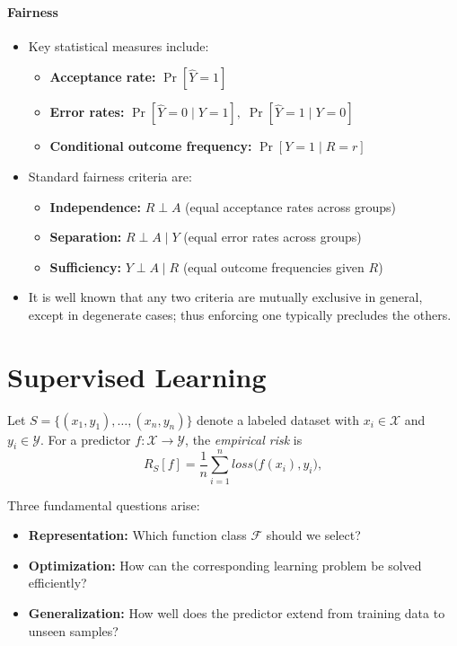 \documentclass[a4paper]{article}
\begin{document}
\paragraph{Fairness}
\begin{itemize}
    \item Key statistical measures include:
        \begin{itemize}
            \item \textbf{Acceptance rate:} $\Pr[\hat{Y} = 1]$
            \item \textbf{Error rates:} $\Pr[\hat{Y} = 0 \mid Y = 1],\; \Pr[\hat{Y} = 1 \mid Y = 0]$
            \item \textbf{Conditional outcome frequency:} $\Pr[Y = 1 \mid R = r]$
        \end{itemize}

    \item Standard fairness criteria are:
        \begin{itemize}
            \item \textbf{Independence:} $R \perp A$ \quad (equal acceptance rates across groups)
            \item \textbf{Separation:} $R \perp A \mid Y$ \quad (equal error rates across groups)
            \item \textbf{Sufficiency:} $Y \perp A \mid R$ \quad (equal outcome frequencies given $R$)
        \end{itemize}
    \item It is well known that any two criteria are mutually exclusive in general, except in degenerate cases; thus enforcing one typically precludes the others.
\end{itemize}

\section{Supervised Learning}
Let $S = \{(x_1, y_1), \ldots, (x_n, y_n)\}$ denote a labeled dataset with $x_i \in \mathcal{X}$ and $y_i \in \mathcal{Y}$.  
For a predictor $f: \mathcal{X} \to \mathcal{Y}$, the \emph{empirical risk} is
\[
    R_S[f] = \frac{1}{n} \sum_{i=1}^n \mathit{loss}\big(f(x_i), y_i\big),
\]

Three fundamental questions arise:
\begin{itemize}
    \item \textbf{Representation:} Which function class $\mathcal{F}$ should we select?
    \item \textbf{Optimization:} How can the corresponding learning problem be solved efficiently?
    \item \textbf{Generalization:} How well does the predictor extend from training data to unseen samples?
\end{itemize}
\end{document}
